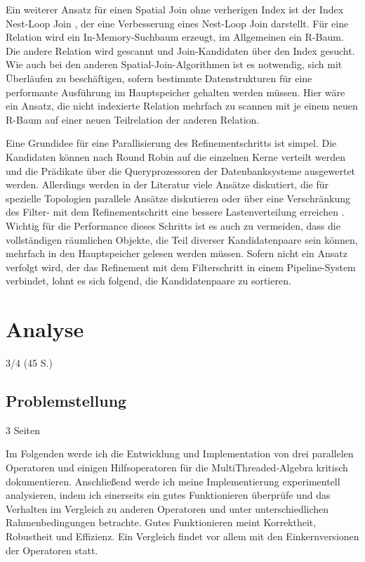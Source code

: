 \documentclass[a4paper,12pt,twoside]{article}
\begin{document}
Ein weiterer Ansatz für einen Spatial Join ohne verherigen Index ist der Index Nest-Loop Join {\autocite[S. 10f]{Jacox2007}}, der eine Verbesserung eines Nest-Loop Join darstellt. Für eine Relation wird ein In-Memory-Suchbaum erzeugt, im Allgemeinen ein R-Baum. Die andere Relation wird gescannt und Join-Kandidaten über den Index gesucht. Wie auch bei den anderen Spatial-Join-Algorithmen ist es notwendig, sich mit Überläufen zu beschäftigen, sofern bestimmte Datenstrukturen für eine performante Ausführung im Hauptspeicher gehalten werden müssen. Hier wäre ein Ansatz, die nicht indexierte Relation mehrfach zu scannen mit je einem neuen R-Baum auf einer neuen Teilrelation der anderen Relation. 

Eine Grundidee für eine Parallisierung des Refinementschritts ist simpel. Die Kandidaten können nach Round Robin auf die einzelnen Kerne verteilt werden und die Prädikate über die Queryprozessoren der Datenbanksysteme ausgewertet werden. Allerdings werden in der Literatur viele Ansätze diskutiert, die für spezielle Topologien parallele Ansätze diskutieren {\autocite{Bouros2019, Rigaux2001}} oder über eine Verschränkung des Filter- mit dem Refinementschritt eine bessere Lastenverteilung erreichen {\autocite{Brinkhoff1996, Jacox2007, Zhou1998}}. Wichtig für die Performance dieses Schritts ist es auch zu vermeiden, dass die vollständigen räumlichen Objekte, die Teil diverser Kandidatenpaare sein können, mehrfach in den Hauptspeicher gelesen werden müssen. Sofern nicht ein Ansatz verfolgt wird, der das Refinement mit dem Filterschritt in einem Pipeline-System verbindet, lohnt es sich {\textcite[ S. 45f]{Jacox2007}} folgend, die Kandidatenpaare zu sortieren.

\section{Analyse}
3/4 (45 S.)

\subsection{Problemstellung} 3 Seiten

Im Folgenden werde ich die Entwicklung und Implementation von drei parallelen Operatoren und einigen Hilfsoperatoren für die MultiThreaded-Algebra kritisch dokumentieren. Anschließend werde ich meine Implementierung experimentell analysieren, indem ich einerseits ein gutes Funktionieren überprüfe und das Verhalten im Vergleich zu anderen Operatoren und unter unterschiedlichen Rahmenbedingungen betrachte. Gutes Funktionieren meint Korrektheit, Robustheit und Effizienz. Ein Vergleich findet vor allem mit den Einkernversionen der Operatoren statt.
\end{document}

